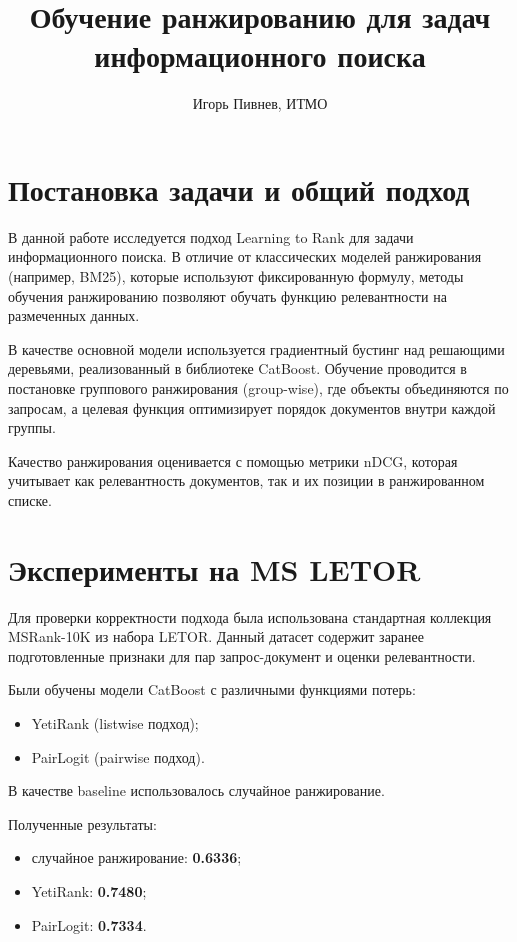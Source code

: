 \documentclass[11pt]{article}
\title{Обучение ранжированию для задач информационного поиска}
\author{Игорь Пивнев, ИТМО}
\begin{document}
\maketitle

\section{Постановка задачи и общий подход}

В данной работе исследуется подход Learning to Rank для задачи информационного
поиска. В отличие от классических моделей ранжирования (например, BM25), которые
используют фиксированную формулу, методы обучения ранжированию позволяют обучать
функцию релевантности на размеченных данных.

В качестве основной модели используется градиентный бустинг над решающими
деревьями, реализованный в библиотеке CatBoost. Обучение проводится в постановке
группового ранжирования (group-wise), где объекты объединяются по запросам, а
целевая функция оптимизирует порядок документов внутри каждой группы.

Качество ранжирования оценивается с помощью метрики nDCG, которая учитывает как
релевантность документов, так и их позиции в ранжированном списке.

\section{Эксперименты на MS LETOR}

Для проверки корректности подхода была использована стандартная коллекция
MSRank-10K из набора LETOR. Данный датасет содержит заранее подготовленные
признаки для пар запрос-документ и оценки релевантности.

Были обучены модели CatBoost с различными функциями потерь:
\begin{itemize}
    \item YetiRank (listwise подход);
    \item PairLogit (pairwise подход).
\end{itemize}

В качестве baseline использовалось случайное ранжирование.

Полученные результаты:
\begin{itemize}
    \item случайное ранжирование: \textbf{0.6336};
    \item YetiRank: \textbf{0.7480};
    \item PairLogit: \textbf{0.7334}.
\end{itemize}
\end{document}
